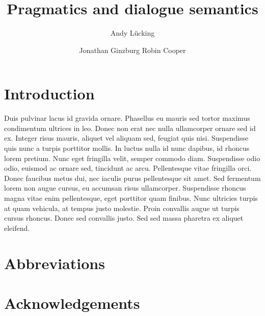 \documentclass[output=paper]{langsci/langscibook}
\author{%
	Andy Lücking\affiliation{Goethe-Universität Frankfurt}%
	\and Jonathan Ginzburg\affiliation{Université Paris Diderot}%
	\lastand Robin Cooper\affiliation{University of Gothenburg}%
}
\title{Pragmatics and dialogue semantics}
\begin{document}
\label{chap-pragmatics}

\section{Introduction} 
Duis pulvinar lacus id gravida ornare. Phasellus eu mauris sed tortor maximus condimentum ultrices in leo. Donec non erat nec nulla ullamcorper ornare sed id ex. Integer risus mauris, aliquet vel aliquam sed, feugiat quis nisi. Suspendisse quis nunc a turpis porttitor mollis. In luctus nulla id nunc dapibus, id rhoncus lorem pretium. Nunc eget fringilla velit, semper commodo diam. Suspendisse odio odio, euismod ac ornare sed, tincidunt ac arcu. Pellentesque vitae fringilla orci. Donec faucibus metus dui, nec iaculis purus pellentesque sit amet. Sed fermentum lorem non augue cursus, eu accumsan risus ullamcorper. Suspendisse rhoncus magna vitae enim pellentesque, eget porttitor quam finibus. Nunc ultricies turpis at quam vehicula, at tempus justo molestie. Proin convallis augue ut turpis cursus rhoncus. Donec sed convallis justo. Sed sed massa pharetra ex aliquet eleifend. 

 
\section*{Abbreviations}
\section*{Acknowledgements}

\printbibliography[heading=subbibliography,notkeyword=this] 
\end{document}
